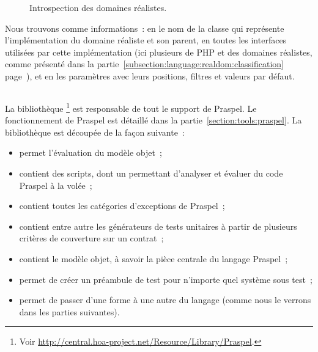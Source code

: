 \begin{example}
\begin{figure}
\caption{\label{figure:tools:reflection-realdom} Introspection des domaines
réalistes.}

\end{figure}
%
Nous trouvons comme informations~: en  le nom de la classe qui
représente l'implémentation du domaine réaliste et son parent, en 
toutes les interfaces utilisées par cette implémentation (ici plusieurs de PHP
et des domaines réalistes, comme présenté dans la
partie~\ref{subsection:language:realdom:classification}
page~\pageref{subsection:language:realdom:classification}), et en 
les paramètres avec leurs positions, filtres et valeurs par défaut.

\end{example}

\subsection{}
\label{subsection:tools:hoa-praspel}

La bibliothèque \footnote{Voir
\url{http://central.hoa-project.net/Resource/Library/Praspel}.} est responsable
de tout le support de Praspel. Le fonctionnement de Praspel est détaillé dans la
partie~\ref{section:tools:praspel}. La bibliothèque est découpée de la façon
suivante~:
%
\begin{itemize}

\item {} permet l'évaluation du modèle objet~;

\item {} contient des scripts, dont un  permettant
d'analyser et évaluer du code Praspel à la volée~;

\item {} contient toutes les catégories d'exceptions de Praspel~;

\item {} contient entre autre les générateurs de tests unitaires à
partir de plusieurs critères de couverture sur un contrat~;

\item {} contient le modèle objet, à savoir la pièce centrale du
langage Praspel~;

\item {} permet de créer un préambule de test pour n'importe quel
système sous test~;

\item {} permet de passer d'une forme à une autre du langage (comme
nous le verrons dans les parties suivantes).

\end{itemize}

